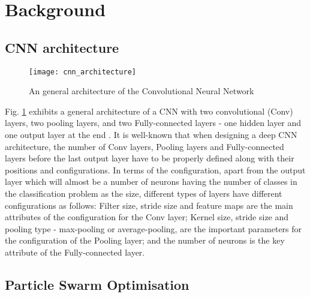 \documentclass[conference]{IEEEtran}
\begin{document}
\section{Background}\label{sec:Background}

\subsection{CNN architecture}\label{sec:CNNArchitecture}

\begin{figure}[!t]
	\centering
	\texttt{[image: cnn\_architecture]}
	\caption{An general architecture of the Convolutional Neural Network \cite{CNNFig:Tim}}
	\label{fig:CNNArchitecture}
\end{figure}

Fig. \ref{fig:CNNArchitecture} exhibits a general architecture of a CNN with two convolutional (Conv) layers, two pooling layers, and two Fully-connected layers - one hidden layer and one output layer at the end \cite{CNNFig:Tim}. It is well-known that when designing a deep CNN architecture, the number of Conv layers, Pooling layers and Fully-connected layers before the last output layer have to be properly defined along with their positions and configurations. In terms of the configuration, apart from the output layer which will almost be a number of neurons having the number of classes in the classification problem as the size, different types of layers have different configurations as follows: Filter size, stride size and feature maps are the main attributes of the configuration for the Conv layer; Kernel size, stride size and pooling type - max-pooling or average-pooling, are the important parameters for the configuration of the Pooling layer; and the number of neurons is the key attribute of the Fully-connected layer. %

\subsection{Particle Swarm Optimisation}
\end{document}
